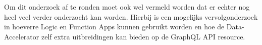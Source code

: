 Om dit onderzoek af te ronden moet ook wel vermeld worden dat er echter nog heel veel verder onderzocht kan worden. Hierbij is een mogelijks vervolgonderzoek in hoeverre Logic en Function Apps kunnen gebruikt worden en hoe de Data-Accelerator zelf extra uitbreidingen kan bieden op de GraphQL API resource.



